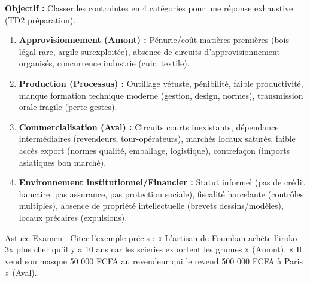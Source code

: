 \documentclass[11pt]{article}
\newcommand{\cle}[1]{{\popxbold\color{popdark}#1}}
\begin{document}
\begin{methode}
\textbf{Objectif :} Classer les contraintes en 4 catégories pour une réponse exhaustive (TD2 préparation).
\begin{enumerate}
    \item \textbf{Approvisionnement (Amont) :} Pénurie/coût matières premières (bois légal rare, argile surexploitée), absence de circuits d'approvisionnement organisés, concurrence industrie (cuir, textile).
    \item \textbf{Production (Processus) :} Outillage vétuste, pénibilité, faible productivité, manque formation technique moderne (gestion, design, normes), transmission orale fragile (perte gestes).
    \item \textbf{Commercialisation (Aval) :} Circuits courts inexistants, dépendance intermédiaires (revendeurs, tour-opérateurs), marchés locaux saturés, faible accès export (normes qualité, emballage, logistique), contrefaçon (imports asiatiques bon marché).
    \item \textbf{Environnement institutionnel/Financier :} Statut informel (pas de crédit bancaire, pas assurance, pas protection sociale), fiscalité harcelante (contrôles multiples), absence de propriété intellectuelle (brevets dessins/modèles), locaux précaires (expulsions).
\end{enumerate}
\cle{Astuce Examen :} Citer l'exemple précis : « L'artisan de Foumban achète l'iroko 3x plus cher qu'il y a 10 ans car les scieries exportent les grumes » (Amont). « Il vend son masque 50 000 FCFA au revendeur qui le revend 500 000 FCFA à Paris » (Aval).
\end{methode}
\end{document}

